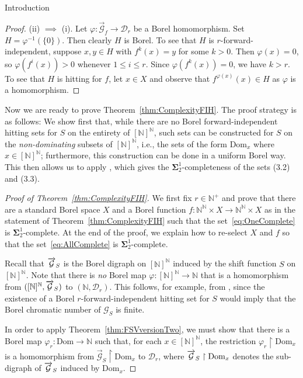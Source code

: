\documentclass[psamsfonts]{amsart}
\theoremstyle{definition}
\newcommand{\N}{\mathbb N}
\newcommand{\Dom}{\text{Dom}}
\theoremstyle{remark}
\numberwithin{equation}{section}
\newcommand{\rest}{\restriction}
\newcommand\mbf{\mathbf}
\newcommand\mcal{\mathcal}
\begin{document}
\begin{section}{Introduction}
\begin{proof}
        (ii) $\implies$ (i). Let $\varphi : \overrightarrow{\mcal{G}}_f \rightarrow \mcal{D}_r$ be a Borel homomorphism. Set $H = \varphi^{-1}(\{0 \})$.
        Then clearly $H$ is Borel.
        To see that $H$ is $r$-forward-independent, suppose $x, y \in H$ with $f^k(x) = y$ for some $k > 0$.
        Then $\varphi(x) = 0$, so $\varphi(f^i(x)) > 0$ whenever $1 \leq i \leq r$. Since $\varphi(f^k(x)) = 0$, we have $k > r$.
        To see that $H$ is hitting for $f$, let $x \in X$ and observe that $f^{\varphi(x)}(x)\in H$ as $\varphi$ is a homomorphism.
    \end{proof}


Now we are ready to prove Theorem~\ref{thm:ComplexityFIH}.
The proof strategy is as follows: We show first that, while there are no Borel forward-independent hitting sets for $S$ on the entirety of $[\N]^{\N}$, such sets can be constructed for $S$ on the \emph{non-dominating} subsets of $[\N]^{\N}$, i.e., the sets of the form $\Dom_x$ where $x \in [\N]^{\N}$; furthermore, this construction can be done in a uniform Borel way.
This then allows us to apply \cite[Theorem~3.1]{fsv2024}, which gives the $\mbf{\Sigma}^1_2$-completeness of the sets (3.2) and (3.3).

\begin{proof}[Proof of Theorem~\ref{thm:ComplexityFIH}]

We first fix $r \in \N^+$ and prove that there are a standard Borel space $X$ and a Borel function $f:\mathbb{N}^\mathbb{N}\times X\to \mathbb{N}^\mathbb{N}\times X$ as in the statement of Theorem~\ref{thm:ComplexityFIH} such that the set~\eqref{eq:OneComplete} is $\mbf{\Sigma}^1_2$-complete. At the end of the proof, we explain how to re-select $X$ and $f$ so that the set~\eqref{eq:AllComplete} is $\mbf{\Sigma}^1_2$-complete.

Recall that $\overrightarrow{\mathcal{G}}_S$ is the Borel digraph on $[\N]^{\N}$ induced by the shift function $S$ on $[\N]^{\N}$.
Note that there is \emph{no} Borel map $\varphi:[\N]^\N\to \mathbb{N}$ that is a homomorphism from $([\N]^\N,\digS)$ to $(\N,\mcal{D}_r)$.
This follows, for example, from \cite[Example~3.2]{kst1999}, since the existence of a Borel $r$-forward-independent hitting set for $S$ would imply that the Borel chromatic number of $\mcal{G}_S$ is finite.


In order to apply Theorem~\ref{thm:FSVversionTwo}, we must show that there is a Borel map $\varphi_r : \Dom \to \N$ such that, for each $x \in [\N]^{\N}$, the restriction $\varphi_r \rest \Dom_x$ is a homomorphism from $\overrightarrow{\mcal{G}}_S \rest \Dom_x$ to $\mcal{D}_r$, where $\digS \rest \Dom_x$ denotes the sub-digraph of $\overrightarrow{\mathcal{G}}_S$ induced by $\Dom_x$.




\end{proof}
\end{section}
\end{document}
